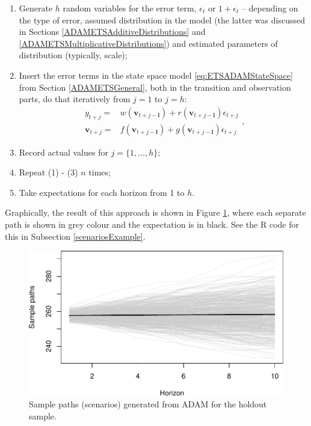 \documentclass[]{book}
\providecommand{\tightlist}{%
  \setlength{\itemsep}{0pt}\setlength{\parskip}{0pt}}
\theoremstyle{definition}
\theoremstyle{definition}
\theoremstyle{definition}
\theoremstyle{definition}
\theoremstyle{remark}
\begin{document}
\begin{enumerate}
\def\labelenumi{\arabic{enumi}.}
\tightlist
\item
  Generate \(h\) random variables for the error term, \(\epsilon_t\) or \(1+\epsilon_t\) -- depending on the type of error, assumed distribution in the model (the latter was discussed in Sections \ref{ADAMETSAdditiveDistributions} and \ref{ADAMETSMultiplicativeDistributions}) and estimated parameters of distribution (typically, scale);
\item
  Insert the error terms in the state space model \eqref{eq:ETSADAMStateSpace} from Section \ref{ADAMETSGeneral}, both in the transition and observation parts, do that iteratively from \(j=1\) to \(j=h\):
  \begin{equation*}
    \begin{aligned}
   {y}_{t+j} = &w(\mathbf{v}_{t+j-\mathbf{l}}) + r(\mathbf{v}_{t+j-\mathbf{l}}) \epsilon_{t+j} \\
   \mathbf{v}_{t+j} = &f(\mathbf{v}_{t+j-\mathbf{l}}) + g(\mathbf{v}_{t+j-\mathbf{l}}) \epsilon_{t+j}
    \end{aligned},
  \end{equation*}
\item
  Record actual values for \(j=\{1, \dots, h\}\);
\item
  Repeat (1) - (3) \(n\) times;
\item
  Take expectations for each horizon from 1 to \(h\).
\end{enumerate}

Graphically, the result of this approach is shown in Figure \ref{fig:adamScenarios}, where each separate path is shown in grey colour and the expectation is in black. See the R code for this in Subsection \ref{scenariosExample}.

\begin{figure}
\centering
\includegraphics{Svetunkov--2022----ADAM_files/figure-latex/adamScenarios-1.pdf}
\caption{\label{fig:adamScenarios}Sample paths (scenarios) generated from ADAM for the holdout sample.}
\end{figure}
\end{document}
